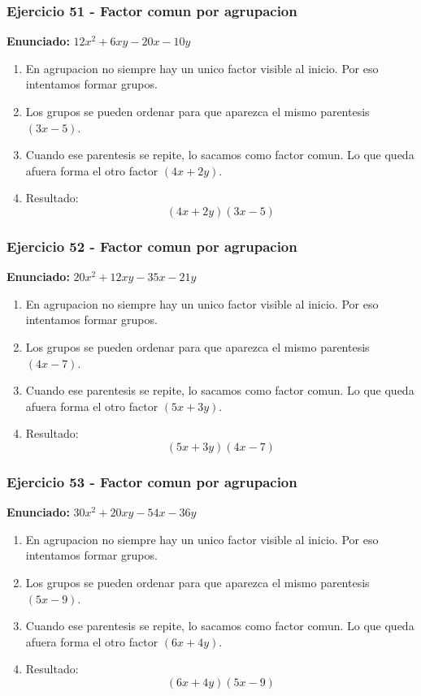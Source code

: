 \documentclass[11pt,a4paper]{article}
\begin{document}
\vspace{0.2cm}
\subsubsection*{Ejercicio 51 - Factor comun por agrupacion}
\textbf{Enunciado:} $ 12 x^{2} + 6 x y - 20 x - 10 y $\par
\begin{enumerate}[leftmargin=2em]
\item En agrupacion no siempre hay un unico factor visible al inicio. Por eso intentamos formar grupos.
\item Los grupos se pueden ordenar para que aparezca el mismo parentesis \((3 x - 5)\).
\item Cuando ese parentesis se repite, lo sacamos como factor comun. Lo que queda afuera forma el otro factor \((4 x + 2 y)\).
\item Resultado: \[\boxed{\left(4 x + 2 y\right)\left(3 x - 5\right)}\]
\end{enumerate}

\vspace{0.2cm}
\subsubsection*{Ejercicio 52 - Factor comun por agrupacion}
\textbf{Enunciado:} $ 20 x^{2} + 12 x y - 35 x - 21 y $\par
\begin{enumerate}[leftmargin=2em]
\item En agrupacion no siempre hay un unico factor visible al inicio. Por eso intentamos formar grupos.
\item Los grupos se pueden ordenar para que aparezca el mismo parentesis \((4 x - 7)\).
\item Cuando ese parentesis se repite, lo sacamos como factor comun. Lo que queda afuera forma el otro factor \((5 x + 3 y)\).
\item Resultado: \[\boxed{\left(5 x + 3 y\right)\left(4 x - 7\right)}\]
\end{enumerate}

\vspace{0.2cm}
\subsubsection*{Ejercicio 53 - Factor comun por agrupacion}
\textbf{Enunciado:} $ 30 x^{2} + 20 x y - 54 x - 36 y $\par
\begin{enumerate}[leftmargin=2em]
\item En agrupacion no siempre hay un unico factor visible al inicio. Por eso intentamos formar grupos.
\item Los grupos se pueden ordenar para que aparezca el mismo parentesis \((5 x - 9)\).
\item Cuando ese parentesis se repite, lo sacamos como factor comun. Lo que queda afuera forma el otro factor \((6 x + 4 y)\).
\item Resultado: \[\boxed{\left(6 x + 4 y\right)\left(5 x - 9\right)}\]
\end{enumerate}
\end{document}
